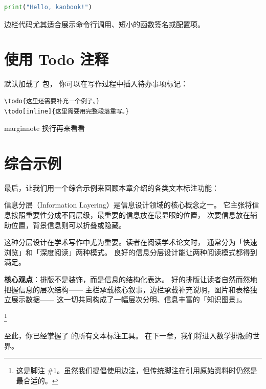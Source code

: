 \begin{marginlisting}
    \caption{一条边栏代码。}
    \begin{lstlisting}[language=Python, style=kaolstplain]
print("Hello, kaobook!")
    \end{lstlisting}
\end{marginlisting}

边栏代码尤其适合展示命令行调用、短小的函数签名或配置项。

\section{使用 Todo 注释}

 默认加载了  包，
你可以在写作过程中插入待办事项标记：

\begin{lstlisting}[style=kaolstplain, caption=Todo 注释用法]
\todo{这里还需要补充一个例子。}
\todo[inline]{这里需要用完整段落重写。}
\end{lstlisting}

marginnote 换行再来看看

\section{综合示例}

最后，让我们用一个综合示例来回顾本章介绍的各类文本标注功能：


信息分层（Information Layering）是信息设计领域的核心概念之一。
它主张将信息按照重要性分成不同层级，最重要的信息放在最显眼的位置，
次要信息放在辅助位置，背景信息则可以折叠或隐藏。


这种分层设计在学术写作中尤为重要。读者在阅读学术论文时，
通常分为「快速浏览」和「深度阅读」两种模式。
良好的信息分层设计能让两种阅读模式都得到满足。

\begin{widepar}
\textbf{核心观点}：排版不是装饰，而是信息的结构化表达。
好的排版让读者自然而然地把握信息的层次结构——
主栏承载核心叙事，边栏承载补充说明，图片和表格独立展示数据——
这一切共同构成了一幅层次分明、信息丰富的「知识图景」。
\end{widepar}

\footnote{这是脚注 \#1。虽然我们提倡使用边注，但传统脚注在引用原始资料时仍然是最合适的。}

至此，你已经掌握了  的所有文本标注工具。
在下一章，我们将进入数学排版的世界。

\endinput
